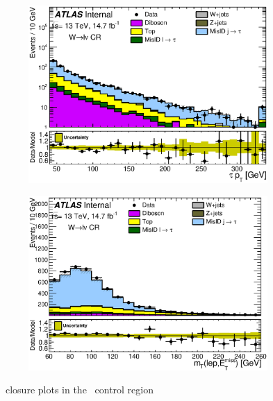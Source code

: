 \begin{figure}[!h]
\begin{subfigure}{0.5\textwidth}
   \includegraphics[width=\textwidth]{figures/DDQCD15_FFWCR_taupt_log.eps}
\caption{}
\end{subfigure} %
\begin{subfigure}{0.5\textwidth}
   \includegraphics[width=\textwidth]{figures/DDQCD15_FFWCR_WlepMT.eps}
\caption{}
\end{subfigure}
\caption{\FF\ closure plots in the \Wjets\ control region}
\label{fig:clWjets}
\end{figure}

